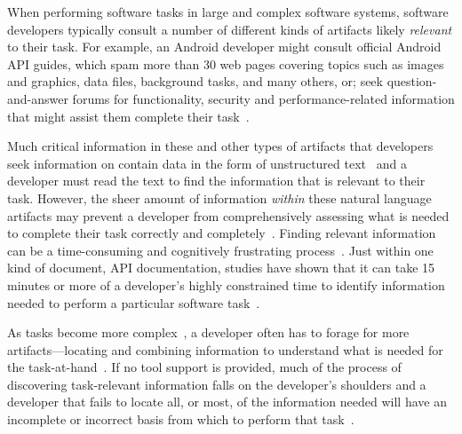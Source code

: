 

When performing software tasks in large and complex software systems, software developers typically consult a number of different kinds of artifacts likely \textit{relevant} to their task. For example, 
an Android developer might consult official Android API guides, which  
spam more than 30 web pages
covering topics such as images and graphics, data files, background tasks, and many others, or; seek question-and-answer forums for functionality, security and performance-related information 
that might assist them complete their task~\cite{parnin2012}.




Much critical information in these and other types of artifacts that developers seek information on 
contain data in the form of unstructured text~\cite{Bavota2016} and 
a developer must read the text to find the information that is relevant to their task.
However, the sheer amount of information \textit{within} these natural language artifacts may prevent a developer from comprehensively assessing what is needed to complete their task correctly and completely~\cite{Murphy2005}.
Finding relevant information can be a time-consuming
and cognitively frustrating process~\cite{Begel2008,
robillard2011field}.  Just within one kind of document, API
documentation, studies have shown that it can take 15 minutes or more
of a developer's highly constrained time to identify 
information needed to perform a particular software task~\cite{endrikat2014, Meyer2017}.




As tasks become more complex~\cite{Pirolli2007, Bystrom1995}, a developer often has to forage
for more artifacts---locating and combining information to understand what is needed for the task-at-hand~\cite{Piorkowski2016}. If no tool support is provided, much of the process of discovering 
task-relevant information falls on the developer's shoulders and 
a developer that fails to locate all, or most, of the information needed
 will have an incomplete or incorrect basis from which to perform that task~\cite{}.













